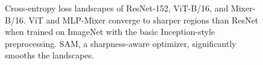 \documentclass{article}
\newcommand{\BG}[1]{\textcolor{blue}{Boqing: #1}}
\begin{document}
\begin{figure}
\centering
{}
\vspace{-5pt}
\caption{Cross-entropy loss landscapes of ResNet-152, ViT-B/16, and Mixer-B/16.
ViT and MLP-Mixer converge to sharper regions than ResNet when trained on ImageNet with the basic Inception-style preprocessing. SAM, a sharpness-aware optimizer, significantly smooths the landscapes.
}
\vspace{-12pt}
\label{fig:land}
\end{figure}

\end{document}
